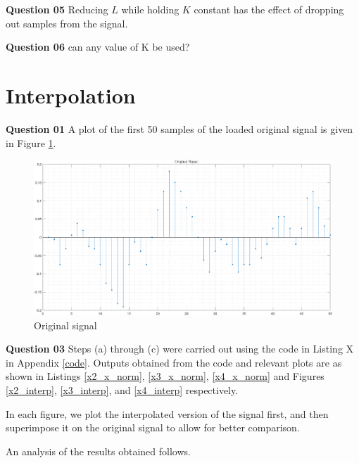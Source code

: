 \documentclass{article}[a4paper]
\begin{document}
	\textbf{Question 05} Reducing $L$ while holding $K$ constant has the effect of dropping out samples from the signal.
	\medskip
	
	\textbf{Question 06} can any value of K be used?
	
	\section{Interpolation}
	
	\textbf{Question 01} A plot of the first 50 samples of the loaded original signal is given in Figure \ref{orig_x1}.
	
	\begin{figure}[H]
		\centering
		\includegraphics[width=0.9\linewidth]{images/q2_orig_sig.png}
		\caption{Original signal}
		\label{orig_x1}
	\end{figure}
	
	\textbf{Question 03} Steps (a) through (c) were carried out using the code in Listing X in Appendix \ref{code}. Outputs obtained from the code and relevant plots are as shown in Listings \ref{x2_x_norm}, \ref{x3_x_norm}, \ref{x4_x_norm} and Figures \ref{x2_interp}, \ref{x3_interp}, and \ref{x4_interp} respectively.
	
	In each figure, we plot the interpolated version of the signal first, and then superimpose it on the original signal to allow for better comparison.
	
	An analysis of the results obtained follows.
	
\end{document}
